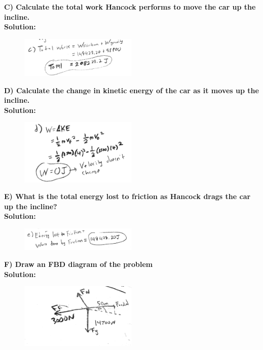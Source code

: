 \documentclass[a4paper,12pt]{article}
\begin{document}
\noindent\textbf{C) Calculate the total work Hancock performs to move the car up the incline.} \\

\noindent\textbf{Solution:}

\begin{figure}[H]
    \centering
    \includegraphics[width=0.5\textwidth]{U3_P1_C} %
\end{figure}

\noindent\textbf{D) Calculate the change in kinetic energy of the car as it moves up the incline.} \\

\noindent\textbf{Solution:}

\begin{figure}[H]
    \centering
    \includegraphics[width=0.5\textwidth]{U3_P1_D} %
\end{figure}

\newpage

\noindent\textbf{E) What is the total energy lost to friction as Hancock drags the car up the incline?} \\

\noindent\textbf{Solution:}

\begin{figure}[H]
    \centering
    \includegraphics[width=0.5\textwidth]{U3_P1_E} %
\end{figure}


\noindent\textbf{F) Draw an FBD diagram of the problem} \\

\noindent\textbf{Solution:}

\begin{figure}[H]
    \centering
    \includegraphics[width=0.5\textwidth]{U3_P1_F} %
\end{figure}
\end{document}

